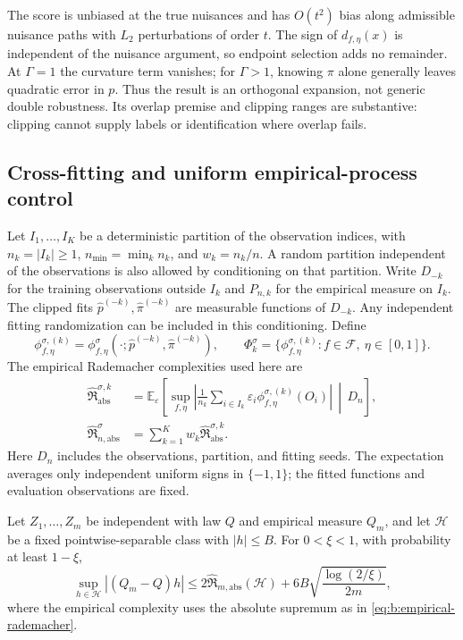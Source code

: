 The score is unbiased at the true nuisances and has $O(t^2)$ bias along
admissible nuisance paths with $L_2$ perturbations of order $t$.
The sign of $d_{f,\eta}(x)$ is independent of the nuisance argument, so
endpoint selection adds no remainder. At $\Gamma=1$ the curvature term
vanishes; for $\Gamma>1$, knowing $\pi$ alone generally leaves quadratic
error in $p$. Thus the result is an orthogonal expansion, not generic
double robustness. Its overlap premise and clipping ranges are substantive:
clipping cannot supply labels or identification where overlap fails.

\subsection{Cross-fitting and uniform empirical-process control}
\label{app:empirical-process}

Let $I_1,\ldots,I_K$ be a deterministic partition of the observation indices,
with $n_k=|I_k|\geq1$, $n_{\min}=\min_k n_k$, and $w_k=n_k/n$.
A random partition independent of the observations is also allowed by
conditioning on that partition. Write $D_{-k}$ for the training observations
outside $I_k$ and $P_{n,k}$ for the empirical measure on $I_k$.
The clipped fits $\widehat p^{(-k)},\widehat\pi^{(-k)}$ are measurable
functions of $D_{-k}$. Any independent fitting randomization can be included
in this conditioning. Define
\[
 \phi^{\sigma,(k)}_{f,\eta}
 =\phi^\sigma_{f,\eta}
 (\cdot;\widehat p^{(-k)},\widehat\pi^{(-k)}),\qquad
 \Phi_k^\sigma=\{\phi^{\sigma,(k)}_{f,\eta}:f\in\mathcal F,
 \ \eta\in[0,1]\}.
\]
The empirical Rademacher complexities used here are
\begin{equation}
 \begin{split}
 \widehat{\mathfrak R}^{\sigma,k}_{\mathrm{abs}}
 &=\mathbb E_\varepsilon\!\left[
 \sup_{f,\eta}\left|\frac1{n_k}
 \sum_{i\in I_k}\varepsilon_i\phi^{\sigma,(k)}_{f,\eta}(O_i)\right|
 \,\middle|\,D_n\right],\\
 \widehat{\mathfrak R}_{n,\mathrm{abs}}^\sigma
 &=\sum_{k=1}^K w_k\widehat{\mathfrak R}^{\sigma,k}_{\mathrm{abs}}.
 \end{split}
 \label{eq:b:empirical-rademacher}
\end{equation}
Here $D_n$ includes the observations, partition, and fitting seeds.
The expectation averages only independent uniform signs in $\{-1,1\}$;
the fitted functions and evaluation observations are fixed.

\begin{lemma}
\label{lemma:b:empirical-rademacher}
Let $Z_1,\ldots,Z_m$ be independent with law $Q$ and empirical measure $Q_m$,
and let $\mathcal H$ be a fixed pointwise-separable class with $|h|\leq B$. For $0<\xi<1$,
with probability at least $1-\xi$,
\begin{equation}
 \sup_{h\in\mathcal H}|(Q_m-Q)h|
 \leq2\widehat{\mathfrak R}_{m,\mathrm{abs}}(\mathcal H)
 +6B\sqrt{\frac{\log(2/\xi)}{2m}},
 \label{eq:b:signed-concentration}
\end{equation}
where the empirical complexity uses the absolute supremum as in
\eqref{eq:b:empirical-rademacher}.
\end{lemma}

